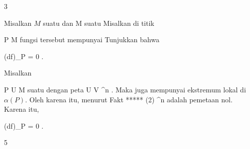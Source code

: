 {3}

{

Misalkan $M$ suatu
dan
 { M } {\R
} {}
suatu
Misalkan di titik

\mavergleichskette
{\vergleichskette
{ P
}
{ \in }{ M
}
{  }{
}
{    }{
}
{   }{
}
}
{}{}{}
fungsi tersebut mempunyai
Tunjukkan bahwa

\mavergleichskettedisp
{\vergleichskette
{ (df)_P
}
{ =} { 0
}
{ } {
}
{ } {
}
{ } {
}
}
{}{}{.}

}
{

Misalkan

\mavergleichskette
{\vergleichskette
{ P
}
{ \in }{ U
}
{ \subseteq }{ M
}
{ }{
}
{ }{
}
}
{}{}{}
suatu
dengan peta
\maabb {\alpha} { U } {V \subseteq \R^n
} {.}
Maka
 juga mempunyai ekstremum lokal di $\alpha(P)$.
Oleh karena itu, menurut
Fakt ***** (2)
 {\R^n } {\R
} {}
adalah pemetaan nol. Karena itu,

\mavergleichskette
{\vergleichskette
{ (df)_P
}
{ = }{ 0
}
{ }{
}
{ }{
}
{ }{
}
}
{}{}{.}

 }



{5}

